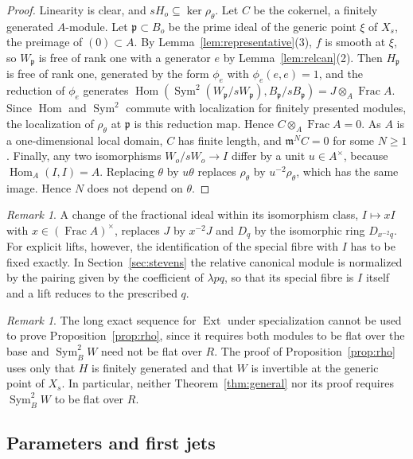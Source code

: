 \documentclass{amsart}
\theoremstyle{definition}
\theoremstyle{remark}
\newtheorem{remark}[theorem]{Remark}
\numberwithin{equation}{section}
\newcommand{\m}{\mathfrak{m}}
\newcommand{\pp}{\mathfrak{p}}
\DeclareMathOperator{\Hom}{Hom}
\DeclareMathOperator{\Ext}{Ext}
\DeclareMathOperator{\Sym}{Sym}
\DeclareMathOperator{\Frac}{Frac}
\begin{document}
\begin{proof}
Linearity is clear, and $sH_o\subseteq\ker\rho_\theta$. Let $C$ be the cokernel, a finitely generated $A$-module. Let $\pp\subset B_o$ be the prime ideal of the generic point $\xi$ of $X_s$, the preimage of $(0)\subset A$. By Lemma~\ref{lem:representative}(3), $f$ is smooth at $\xi$, so $W_\pp$ is free of rank one with a generator $e$ by Lemma~\ref{lem:relcan}(2). Then $H_\pp$ is free of rank one, generated by the form $\phi_e$ with $\phi_e(e,e)=1$, and the reduction of $\phi_e$ generates $\Hom(\Sym^2(W_\pp/sW_\pp),B_\pp/sB_\pp)=J\otimes_A\Frac A$. Since $\Hom$ and $\Sym^2$ commute with localization for finitely presented modules, the localization of $\rho_\theta$ at $\pp$ is this reduction map. Hence $C\otimes_A\Frac A=0$. As $A$ is a one-dimensional local domain, $C$ has finite length, and $\m^NC=0$ for some $N\ge1$. Finally, any two isomorphisms $W_o/sW_o\to I$ differ by a unit $u\in A^\times$, because $\Hom_A(I,I)=A$. Replacing $\theta$ by $u\theta$ replaces $\rho_\theta$ by $u^{-2}\rho_\theta$, which has the same image. Hence $N$ does not depend on $\theta$.
\end{proof}

\begin{remark}\label{rem:normalization}
A change of the fractional ideal within its isomorphism class, $I\mapsto xI$ with $x\in(\Frac A)^\times$, replaces $J$ by $x^{-2}J$ and $D_q$ by the isomorphic ring $D_{x^{-2}q}$. For explicit lifts, however, the identification of the special fibre with $I$ has to be fixed exactly. In Section~\ref{sec:stevens} the relative canonical module is normalized by the pairing given by the coefficient of $\lambda pq$, so that its special fibre is $I$ itself and a lift reduces to the prescribed $q$.
\end{remark}

\begin{remark}\label{rem:dJvS}
The long exact sequence for $\Ext$ under specialization \cite[(A.3)]{dJvS} cannot be used to prove Proposition~\ref{prop:rho}, since it requires both modules to be flat over the base and $\Sym^2_BW$ need not be flat over $R$. The proof of Proposition~\ref{prop:rho} uses only that $H$ is finitely generated and that $W$ is invertible at the generic point of $X_s$. In particular, neither Theorem~\ref{thm:general} nor its proof requires $\Sym^2_BW$ to be flat over $R$.
\end{remark}

\subsection{Parameters and first jets}
\end{document}
